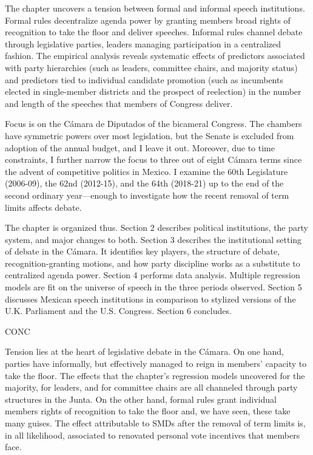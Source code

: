 The chapter uncovers a tension between formal and informal speech institutions. Formal rules decentralize agenda power by granting members broad rights of recognition to take the floor and deliver speeches. Informal rules channel debate through legislative parties, leaders managing participation in a centralized fashion. The empirical analysis reveals systematic effects of predictors associated with party hierarchies (such as leaders, committee chairs, and majority status) and predictors tied to individual candidate promotion (such as incumbents elected in single-member districts and the prospect of reelection) in the number and length of the speeches that members of Congress deliver. 

Focus is on the Cámara de Diputados of the bicameral Congress. The chambers have symmetric powers over most legislation, but the Senate is excluded from adoption of the annual budget, and I leave it out. Moreover, due to time constraints, I further narrow the focus to three out of eight Cámara terms since the advent of competitive politics in Mexico. I examine the 60th Legislature (2006-09), the 62nd (2012-15), and the 64th (2018-21) up to the end of the second ordinary year---enough to investigate how the recent removal of term limits affects debate.

The chapter is organized thus. Section 2 describes political institutions, the party system, and major changes to both. Section 3 describes the institutional setting of debate in the Cámara. It identifies key players, the structure of debate, recognition-granting motions, and how party discipline works as a substitute to centralized agenda power. Section 4 performs data analysis. Multiple regression models are fit on the universe of speech in the three periods observed. Section 5 discusses Mexican speech institutions in comparison to stylized versions of the U.K. Parliament and the U.S. Congress. Section 6 concludes. 





CONC

Tension lies at the heart of legislative debate in the Cámara. On one hand, parties have informally, but effectively managed to reign in members' capacity to take the floor. The effects that the chapter's regression models uncovered for the majority, for leaders, and for committee chairs are all channeled through party structures in the Junta. On the other hand, formal rules grant individual members rights of recognition to take the floor and, we have seen, these take many guises. The effect attributable to SMDs after the removal of term limits is, in all likelihood, associated to renovated personal vote incentives that members face. 

